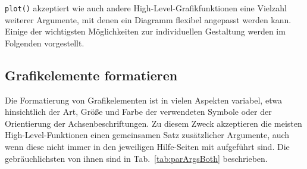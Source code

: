 \lstinline!plot()! akzeptiert wie auch andere High-Level-Grafikfunktionen eine Vielzahl weiterer Argumente, mit denen ein Diagramm flexibel angepasst werden kann. Einige der wichtigsten Möglichkeiten zur individuellen Gestaltung werden im Folgenden vorgestellt.

\subsection{Grafikelemente formatieren}
\label{sec:par}

Die Formatierung von Grafikelementen ist in vielen Aspekten variabel, etwa hinsichtlich der Art, Größe und Farbe der verwendeten Symbole oder der Orientierung der Achsenbeschriftungen. Zu diesem Zweck akzeptieren die meisten High-Level-Funktionen einen gemeinsamen Satz zusätzlicher Argumente, auch wenn diese nicht immer in den jeweiligen Hilfe-Seiten mit aufgeführt sind. Die gebräuchlichsten von ihnen sind in Tab.\ \ref{tab:parArgsBoth} beschrieben.


